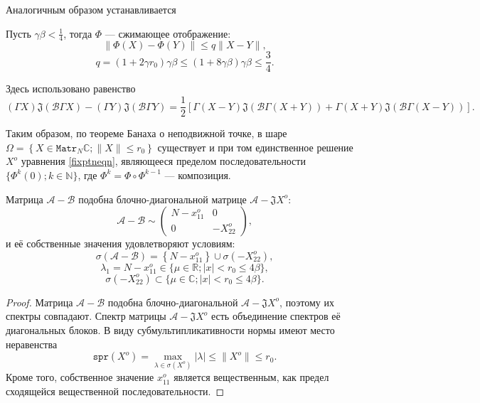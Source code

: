 Аналогичным образом устанавливается
\begin{lemma}
    Пусть \(\gamma\beta<\frac14\),
    тогда \( \Phi \) --- сжимающее отображение:
    \[ \| \Phi(X) - \Phi(Y) \| \leq q \|X - Y\|, \]
    \[ q = (1+2\gamma r_0) \gamma\beta \leq (1+8\gamma\beta)\gamma\beta \leq \frac34. \]
\end{lemma}
Здесь использовано равенство
\[ (\Gamma X) \mathfrak{J}(\mathcal{B}\Gamma X) - (\Gamma Y) \mathfrak{J}(\mathcal{B}\Gamma Y) =
    \frac12\left[
        \Gamma(X-Y) \mathfrak{J}(\mathcal{B}\Gamma(X+Y))
    +   \Gamma(X+Y) \mathfrak{J}(\mathcal{B}\Gamma(X-Y))
    \right]. \]

Таким образом, по теореме Банаха о неподвижной точке,
в шаре \( \Omega = \left\{ X\in\mathtt{Matr}_N\mathbb{C}; \|X\| \leq r_0 \right\} \)
существует и при том единственное решение \( X^o \) уравнения \eqref{fixptneqn},
являющееся пределом последовательности \( \{ \Phi^k(\mathcal{0}); k\in\mathbb{N} \} \),
где \( \Phi^k = \Phi\circ\Phi^{k-1} \) --- композиция.

\begin{lemma}
Матрица \( \mathcal{A} - \mathcal{B} \) подобна блочно-диагональной матрице \( \mathcal{A} - \mathfrak{J} X^o \):
\[ \mathcal{A} - \mathcal{B} \sim
\begin{pmatrix}
N - x_{11}^o & 0 \\
0 & -X_{22}^o
\end{pmatrix}, \]
и её собственные значения удовлетворяют условиям:
\[ \sigma\left(\mathcal{A} - \mathcal{B}\right) = \left\{N-x_{11}^o\right\}\cup \sigma\left(-X_{22}^o\right), \]
\[ \lambda_1 = N-x_{11}^o \in \{ \mu\in\mathbb{R}; \lvert x \rvert < r_0 \leq 4\beta \}, \]
\[ \sigma\left(-X_{22}^o\right) \subset \{ \mu\in\mathbb{C}; \lvert x \rvert < r_0 \leq 4\beta \}. \]
\end{lemma}
\begin{proof}
    Матрица \( \mathcal{A} - \mathcal{B} \) подобна блочно-диагональной \( \mathcal{A} - \mathfrak{J} X^o \),
    поэтому их спектры совпадают.
    Спектр матрицы \( \mathcal{A} - \mathfrak{J} X^o \) есть объединение спектров её диагональных блоков.
    В виду субмультипликативности нормы имеют место неравенства
    \[ \mathtt{spr}(X^o) = \max_{\lambda\in\sigma(X^o)}\lvert\lambda\rvert \leq \|X^o\| \leq r_0. \]
    Кроме того, собственное значение \( x_{11}^o \) является вещественным, как предел сходящейся вещественной последовательности.
\end{proof}
